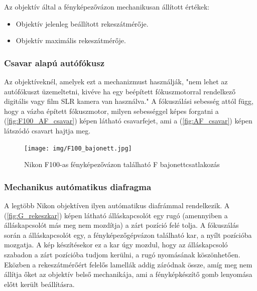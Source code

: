 Az objektív által a fényképezővázon mechanikusan állított értékek:
\begin{itemize}
    \item Objektív jelenleg beállított rekeszátmérője. \cite{Lens_naming}
    \item Objektív maximális rekeszátmérője. \cite{Lens_naming}
\end{itemize}

\subsubsection{Csavar alapú autófókusz}

Az objektíveknél, amelyek ezt a mechanizmust használják, "nem lehet az autófókuszt üzemeltetni, kivéve ha egy beépített fókuszmotorral rendelkező digitális vagy film SLR kamera van használva." A fókuszálási sebesség attól függ, hogy a vázba épített fókuszmotor, milyen sebességgel képes forgatni a (\ref{fig:F100_AF_csavar}) képen látható csavarfejet, ami a (\ref{fig:AF_csavar}) képen látszódó csavart hajtja meg.


\begin{figure}[H]
	\centering
	\texttt{[image: img/F100\_bajonett.jpg]}
	\caption{Nikon F100-as fényképezővázon található F bajonettcsatlakozás}
	\label{fig:F_bajonett}
\end{figure}

\subsubsection{Mechanikus autómatikus diafragma}
A legtöbb Nikon objektíven ilyen autómatikus diafrámmal rendelkezik.
A (\ref{fig:G_rekeszkar}) képen látható álláskapcsolót egy rugó (amennyiben a álláskapcsolót más meg nem mozdítja) a zárt pozíció felé tolja.
A fókuszálás során a álláskapcsolót egy, a fényképezőgépvázon található kar, a nyílt pozícióba mozgatja.
A kép készítésekor ez a kar úgy mozdul, hogy az álláskapcsoló szabadon a zárt pozícióba tudjom kerülni, a rugó nyomásának köszönhetően.
Eközben a rekeszátmérőért felelős lamellák addig záródnak össze, amíg meg nem állítja őket az objektív belső mechanikája, ami a fényképkészítő gomb lenyomása előtt került beállításra.

